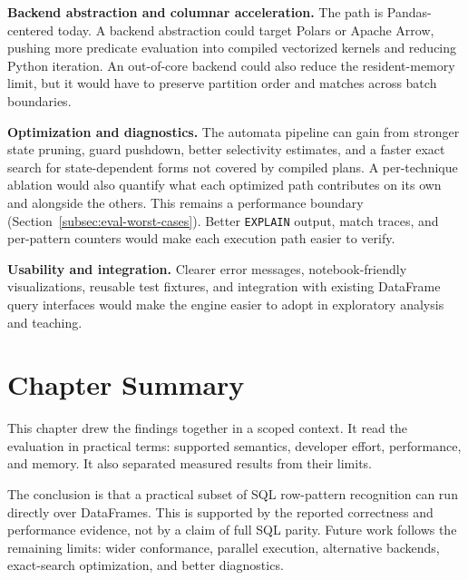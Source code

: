 \textbf{Backend abstraction and columnar acceleration.}
The path is Pandas-centered today.  A backend abstraction
could target Polars or Apache Arrow, pushing more predicate evaluation
into compiled vectorized kernels and reducing Python iteration.  An
out-of-core backend could also reduce the resident-memory limit, but it
would have to preserve partition order and matches across batch
boundaries.

\textbf{Optimization and diagnostics.}
The automata pipeline can gain from stronger state pruning, guard
pushdown, better selectivity estimates, and a faster exact search for
state-dependent forms not covered by compiled plans.  A per-technique
ablation would also quantify what each optimized path contributes on
its own and alongside the others.  This remains a
performance boundary (Section~\ref{subsec:eval-worst-cases}).  Better
\texttt{EXPLAIN} output, match traces, and per-pattern counters would
make each execution path easier to verify.

\textbf{Usability and integration.}
Clearer error messages, notebook-friendly visualizations, reusable test
fixtures, and integration with existing DataFrame query interfaces
would make the engine easier to adopt in exploratory analysis and
teaching.

\section{Chapter Summary}
\label{sec:conc-summary}

This chapter drew the findings together in a scoped context.  It read
the evaluation in practical terms: supported semantics, developer
effort, performance, and memory.  It also separated measured results
from their limits.

The conclusion is that a practical subset of SQL row-pattern
recognition can run directly over DataFrames.  This is supported by the
reported correctness and performance evidence, not by a claim of full
SQL parity.  Future work follows the remaining limits: wider
conformance, parallel execution, alternative backends, exact-search
optimization, and better diagnostics.
